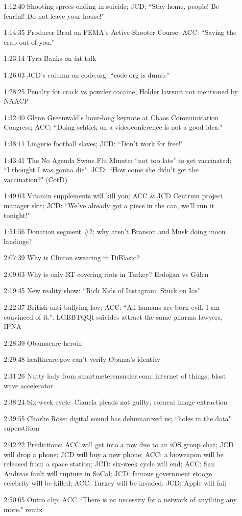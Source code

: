 \documentclass{report}
\newcommand{\mono}[1]{{\fontspec{Courier}#1}}
\begin{document}
\begin{itemize}
\item[\mono{1:12:40}] Shooting sprees ending in suicide; JCD: ``Stay home, people! Be fearful! Do not leave your house!"
\item[\mono{1:14:35}] Producer Brad on FEMA's Active Shooter Course; ACC: ``Saving the crap out of you."
\item[\mono{1:23:14}] Tyra Banks on fat talk
\item[\mono{1:26:03}] JCD's column on code.org: ``code.org is dumb."
\item[\mono{1:28:25}] Penalty for crack vs powder cocaine; Holder lawsuit not mentioned by NAACP
\item[\mono{1:32:40}] Glenn Greenwald's hour-long keynote at Chaos Communication Congress; ACC: ``Doing schtick on a videoconference is not a good idea."
\item[\mono{1:38:11}] Lingerie football slaves; JCD: ``Don't work for free!"
\item[\mono{1:43:41}] The No Agenda Swine Flu Minute: ``not too late" to get vaccinated; ``I thought I was gonna die"; JCD: ``How come she didn't get the vaccination?" (CotD)
\item[\mono{1:49:03}] Vitamin supplements will kill you; ACC \& JCD Centrum project manager skit; JCD: ``We've already got a piece in the can, we'll run it tonight!"
\item[\mono{1:51:56}] Donation segment \#2; why aren't Branson and Musk doing moon landings?
\item[\mono{2:07:39}] Why is Clinton swearing in DiBlasio?
\item[\mono{2:09:03}] Why is only RT covering riots in Turkey? Erdoğan vs Gülen
\item[\mono{2:19:45}] New reality show: ``Rich Kids of Instagram: Stuck on Ice"
\item[\mono{2:22:37}] British anti-bullying law; ACC: ``All humans are born evil. I am convinced of it."; LGBBTQQI suicides attract the same pharma lawyers; IPNA
\item[\mono{2:28:39}] Obamacare heroin
\item[\mono{2:29:48}] healthcare.gov can't verify Obama's identity
\item[\mono{2:31:26}] Nutty lady from smartmetersmurder.com; internet of things; blast wave accelerator
\item[\mono{2:38:24}] Six-week cycle: Ciancia pleads not guilty; corneal image extraction
\item[\mono{2:39:55}] Charlie Rose: digital sound has dehumanized us; ``holes in the data" superstition
\item[\mono{2:42:22}] Predictions: ACC will get into a row due to an iOS group chat; JCD will drop a phone; JCD will buy a new phone; ACC: a bioweapon will be released from a space station; JCD: six-week cycle will end; ACC: San Andreas fault will rupture in SoCal; JCD: famous government stooge celebrity will be killed; ACC: Turkey will be invaded; JCD: Apple will fail
\item[\mono{2:50:05}] Outro clip: ACC ``There is no necessity for a network of anything any more." remix
\end{itemize}
\end{document}
